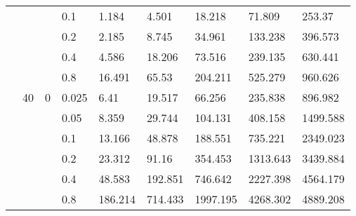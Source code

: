 \begin{longtable}{|l|l|l|l|l|l|l|l|l|}
\cmidrule{4-9} &     &          & 0.1            & 1.184      & 4.501      & 18.218     & 71.809     & 253.37     \\
\cmidrule{4-9} &     &          & 0.2            & 2.185      & 8.745      & 34.961     & 133.238    & 396.573    \\
\cmidrule{4-9} &     &          & 0.4            & 4.586      & 18.206     & 73.516     & 239.135    & 630.441    \\
\cmidrule{4-9} &     &          & 0.8            & 16.491     & 65.53      & 204.211    & 525.279    & 960.626    \\
\cmidrule{2-9} & 40  & 0        & 0.025          & 6.41       & 19.517     & 66.256     & 235.838    & 896.982    \\
\cmidrule{4-9} &     &          & 0.05           & 8.359      & 29.744     & 104.131    & 408.158    & 1499.588   \\
\cmidrule{4-9} &     &          & 0.1            & 13.166     & 48.878     & 188.551    & 735.221    & 2349.023   \\
\cmidrule{4-9} &     &          & 0.2            & 23.312     & 91.16      & 354.453    & 1313.643   & 3439.884   \\
\cmidrule{4-9} &     &          & 0.4            & 48.583     & 192.851    & 746.642    & 2227.398   & 4564.179   \\
\cmidrule{4-9} &     &          & 0.8            & 186.214    & 714.433    & 1997.195   & 4268.302   & 4889.208   \\
\bottomrule
\end{longtable}